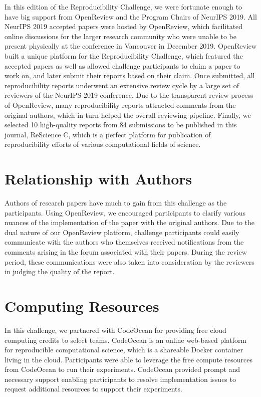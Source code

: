 In this edition of the Reproducibility Challenge, we were fortunate enough to have big support from OpenReview and the Program Chairs of NeurIPS 2019. All NeurIPS 2019 accepted papers were hosted by OpenReview, which facilitated online discussions for the larger research community who were unable to be present physically at the conference in Vancouver in December 2019. OpenReview built a unique platform for the Reproducibility Challenge, which featured the accepted papers as well as allowed challenge participants to claim a paper to work on, and later submit their reports based on their claim. Once submitted, all reproducibility reports underwent an extensive review cycle by a large set of reviewers of the NeurIPS 2019 conference. Due to the transparent review process of OpenReview, many reproducibility reports attracted comments from the original authors, which in turn helped the overall reviewing pipeline. Finally, we selected 10 high-quality reports from 84 submissions to be published in this journal, ReScience C, which is a perfect platform for publication of reproducibility efforts of various computational fields of science.

\section{Relationship with Authors}

Authors of research papers have much to gain from this challenge as the participants. Using OpenReview, we encouraged participants to clarify various nuances of the implementation of the paper with the original authors. Due to the dual nature of our OpenReview platform, challenge participants could easily communicate with the authors who themselves received notifications from the comments arising in the forum associated with their papers. During the review period, these communications were also taken into consideration by the reviewers in judging the quality of the report.

\section{Computing Resources} 

In this challenge, we partnered with CodeOcean for providing free cloud computing credits to select teams. CodeOcean is an online web-based platform for reproducible computational science, which is a shareable Docker container living in the cloud. Participants were able to leverage the free compute resources from CodeOcean to run their experiments. CodeOcean provided prompt and necessary support enabling participants to resolve implementation issues to request additional resources to support their experiments.

